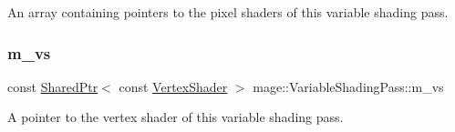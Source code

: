An array containing pointers to the pixel shaders of this variable shading pass. \hypertarget{classmage_1_1_variable_shading_pass_aa91a1e8628c2f671adadd919376aa67e}{}\label{classmage_1_1_variable_shading_pass_aa91a1e8628c2f671adadd919376aa67e} 
\subsubsection{\texorpdfstring{m\+\_\+vs}{m\_vs}}
{\footnotesize\ttfamily const \hyperlink{namespacemage_a1e01ae66713838a7a67d30e44c67703e}{Shared\+Ptr}$<$ const \hyperlink{classmage_1_1_vertex_shader}{Vertex\+Shader} $>$ mage\+::\+Variable\+Shading\+Pass\+::m\+\_\+vs\hspace{0.3cm}{\ttfamily [private]}}

A pointer to the vertex shader of this variable shading pass. 